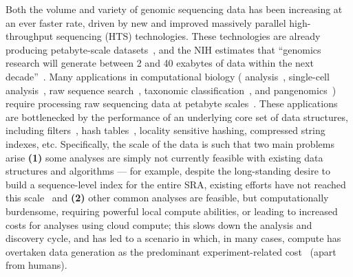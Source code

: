 Both the volume and variety of genomic sequencing data has been increasing at an ever faster rate, driven by new and improved massively parallel high-throughput sequencing (HTS) technologies.  These technologies are already producing
petabyte-scale datasets~\cite{kodama2012sequence}, and the NIH estimates that ``genomics research will generate between 2 and 40 exabytes of data within the next decade''~\cite{NHGRIDataScience}. Many applications in computational biology (\kmer
analysis~\cite{MarccaisKi11}, single-cell analysis~\cite{he2022alevin}, raw sequence search~\cite{solomon2016fast}, taxonomic classification~\cite{wood2014kraken}, and pangenomics~\cite{computational2018computational})
require processing raw sequencing data at petabyte scales~\cite{kodama2012sequence}. 
%
These applications are bottlenecked by the performance of an underlying core set of data structures, including filters~\cite{cite-place-where-bottleneck}, hash tables~\cite{same}, locality sensitive hashing, compressed string indexes, etc.%
Specifically, the scale of the data is such that two main problems arise \textbf{(1)} some analyses are simply not currently feasible with existing data structures and algorithms --- for example, despite the long-standing desire to build a sequence-level index for the entire SRA, existing efforts have not reached this scale~\cite{Karasikov2020, HarrisM20, SolomonK17, almodaresi2022incrementally, AlmodaresiPFJP20, PandeyABFJP18Cell} and \textbf{(2)} other common analyses are feasible, but computationally burdensome, requiring powerful local compute abilities, or leading to increased costs for analyses using cloud compute; this slows down the analysis and discovery cycle, and has led to a scenario in which, in many cases, compute has overtaken data generation as the predominant experiment-related cost~\cite{Muir_2016} (apart from humans). 


